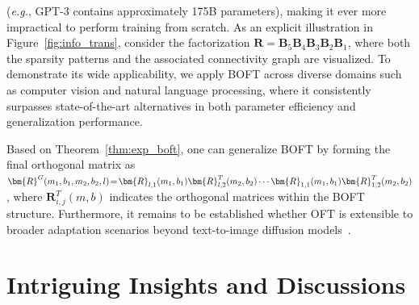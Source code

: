 \begin{theorem}
(\emph{e.g.}, GPT-3 contains approximately 175B parameters), making it ever more impractical to perform training from scratch. As an explicit illustration in Figure~\ref{fig:info_trans}, consider the factorization $\bm{R}=\bm{B}_5\bm{B}_4\bm{B}_3\bm{B}_2\bm{B}_1$, where both the sparsity patterns and the associated connectivity graph are visualized. To demonstrate its wide applicability, we apply BOFT across diverse domains such as computer vision and natural language processing, where it consistently surpasses state-of-the-art alternatives in both parameter efficiency and generalization performance. \end{theorem}

Based on Theorem~\ref{thm:exp_boft}, one can generalize BOFT by forming the final orthogonal matrix as $\thickmuskip=2mu \medmuskip=2mu \bm{R}^G(m_1,b_1,m_2,b_2,l)=\bm{R}_{l,1}(m_1,b_1)\bm{R}_{l,2}^T(m_2,b_2)\cdots\bm{R}_{1,1}(m_1,b_1)\bm{R}_{1,2}^T(m_2,b_2)$, where $\bm{R}_{i,j}^T(m,b)$ indicates the orthogonal matrices within the BOFT structure. Furthermore, it remains to be established whether OFT is extensible to broader adaptation scenarios beyond text-to-image diffusion models~\cite{qiu2023controlling}. \section{Intriguing Insights and Discussions}

